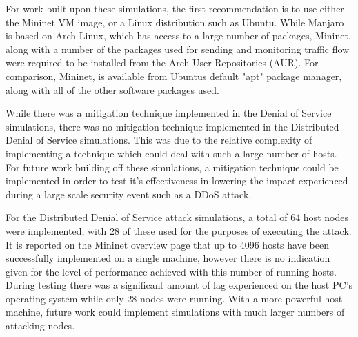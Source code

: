For work built upon these simulations, the first recommendation is to use either
the Mininet VM image, or a Linux distribution such as Ubuntu. While Manjaro is
based on Arch Linux, which has access to a large number of packages, Mininet,
along with a number of the packages used for sending and monitoring traffic flow
were required to be installed from the Arch User Repositories (AUR). For
comparison, Mininet, is available from Ubuntus default "apt" package manager,
along with all of the other software packages used.

While there was a mitigation technique implemented in the Denial of Service
simulations, there was no mitigation technique implemented in the Distributed
Denial of Service simulations. This was due to the relative complexity of
implementing a technique which could deal with such a large number of hosts. For
future work building off these simulations, a mitigation technique could be
implemented in order to test it's effectiveness in lowering the impact
experienced during a large scale security event such as a DDoS attack.

For the Distributed Denial of Service attack simulations, a total of 64 host
nodes were implemented, with 28 of these used for the purposes of executing the
attack. It is reported on the Mininet overview page that up to 4096 hosts have
been successfully implemented on a single machine, however there is no
indication given for the level of performance achieved with this number of
running hosts. During testing there was a significant amount of lag experienced
on the host PC's operating system while only 28 nodes were running. With a more
powerful host machine, future work could implement simulations with much larger
numbers of attacking nodes.
